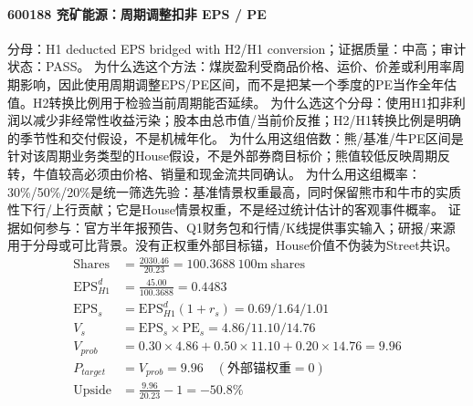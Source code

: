 \paragraph{600188 兖矿能源：周期调整扣非 EPS / PE}
分母：H1 deducted EPS bridged with H2/H1 conversion；证据质量：中高；审计状态：PASS。
为什么选这个方法：煤炭盈利受商品价格、运价、价差或利用率周期影响，因此使用周期调整EPS/PE区间，而不是把某一个季度的PE当作全年估值。H2转换比例用于检验当前周期能否延续。
为什么选这个分母：使用H1扣非利润以减少非经常性收益污染；股本由总市值/当前价反推；H2/H1转换比例是明确的季节性和交付假设，不是机械年化。
为什么用这组倍数：熊/基准/牛PE区间是针对该周期业务类型的House假设，不是外部券商目标价；熊值较低反映周期反转，牛值较高必须由价格、销量和现金流共同确认。
为什么用这组概率：30\%/50\%/20\%是统一筛选先验：基准情景权重最高，同时保留熊市和牛市的实质性下行/上行贡献；它是House情景权重，不是经过统计估计的客观事件概率。
证据如何参与：官方半年报预告、Q1财务包和行情/K线提供事实输入；研报/来源用于分母或可比背景。没有正权重外部目标锚，House价值不伪装为Street共识。
\begin{align*}
\mathrm{Shares} &= \frac{2030.46}{20.23}=100.3688\ \mathrm{100m\ shares}\\
\mathrm{EPS}_{H1}^d &= \frac{45.00}{100.3688}=0.4483\\
\mathrm{EPS}_s &= \mathrm{EPS}_{H1}^d(1+r_s)=0.69/1.64/1.01\\
V_s &= \mathrm{EPS}_s\times \mathrm{PE}_s=4.86/11.10/14.76\\
V_{prob} &= 0.30\times 4.86+0.50\times 11.10+0.20\times 14.76=9.96\\
P_{target} &= V_{prob}=9.96\quad(\text{外部锚权重}=0)\\
\mathrm{Upside} &= \frac{9.96}{20.23}-1=-50.8\%\\
\end{align*}

